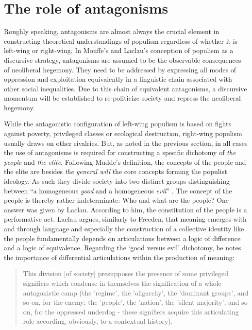 \documentclass[a4paper]{scrreprt}
\begin{document}
\section{The role of antagonisms}
Roughly speaking, antagonisms are almost always the crucial element in constructing theoretical understandings of populism regardless of whether it is left-wing or right-wing. In Mouffe's and Laclau's conception of populism as a discursive strategy, antagonisms are assumed to be the observable consequences of neoliberal hegemony. They need to be addressed by expressing all modes of oppression and exploitation equivalently in a linguistic chain associated with other social inequalities. Due to this chain of equivalent antagonisms, a discursive momentum will be established to re-politicize society and repress the neoliberal hegemony. \cite[p.~135]{laclaumouffe:2001}\par
While the antagonistic configuration of left-wing populism is based on fights against poverty, privileged classes or ecological destruction, right-wing populism usually draws on other rivalries. But, as noted in the previous section, in all cases the use of antagonisms is required for constructing a specific dichotomy of {\em the people} and {\em the elite}. Following Mudde's definition, the concepts of the people and the elite are besides {\em the general will} the core concepts forming the populist ideology. As such they divide society into two distinct groups distinguishing between ``a homogeneous {\em good} and a homogeneous {\em evil}'' \cite[p.~7]{mudde:2017}. The concept of the people is thereby rather indeterminate: Who and what are the people? One answer was given by Laclau. According to him, the constitution of the people is a performative act. Laclau argues, similarly to Freeden, that meaning emerges with and through language and especially the construction of a collective identity like the people fundamentally depends on articulations between a logic of difference and a logic of equivalence. \cite[p.~x]{laclau:2005} Regarding the `good versus evil' dichotomy, he notes the importance of differential articulations within the production of meaning:
\begin{quote}
    This division [of society] presupposes the presence of some privileged signifiers which condense in themselves the signification of a whole antagonistic camp (the 'regime', the 'oligarchy', the 'dominant groups', and so on, for the enemy; the 'people', the 'nation', the 'silent majority', and so on, for the oppressed underdog - these signifiers acquire this articulating role according, obviously, to a contextual history). \cite[p.~87]{laclau:2005}
\end{quote}
\end{document}
